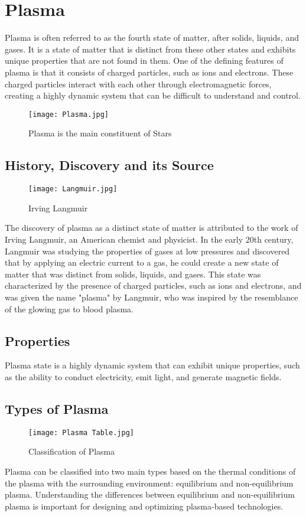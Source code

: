 \documentclass{article}
\begin{document}
\section{Plasma}
\large
Plasma is often referred to as the fourth state of matter, after solids, liquids, and gases. It is a state of matter that is distinct from these other states and exhibits unique properties that are not found in them. One of the defining features of plasma is that it consists of charged particles, such as ions and electrons. These charged particles interact with each other through electromagnetic forces, creating a highly dynamic system that can be difficult to understand and control.
\begin{figure}
\centering
\texttt{[image: Plasma.jpg]}
\caption{\label{fig:Plasma } Plasma is the main constituent of Stars}
\end{figure}

\subsection{History, Discovery and its Source}
\begin{wrapfigure}{l}{0.35\textwidth}
    \centering
    \texttt{[image: Langmuir.jpg]}
    \caption{\label{fig:Langmuir} Irving Langmuir} 
\end{wrapfigure}

The discovery of plasma as a distinct state of matter is attributed to the work of Irving Langmuir, an American chemist and physicist. In the early 20th century, Langmuir was studying the properties of gases at low pressures and discovered that by applying an electric current to a gas, he could create a new state of matter that was distinct from solids, liquids, and gases. This state was characterized by the presence of charged particles, such as ions and electrons, and was given the name "plasma" by Langmuir, who was inspired by the resemblance of the glowing gas to blood plasma.

\subsection{Properties}
\large
Plasma state is a highly dynamic system that can exhibit unique properties, such as the ability to conduct electricity, emit light, and generate magnetic fields.
\subsection{Types of Plasma}
 \begin{figure}[h]
\centering
\texttt{[image: Plasma Table.jpg]}
\caption{\label{fig:Plasma Table } Classification of Plasma}
\end{figure}
Plasma can be classified into two main types based on the thermal conditions of the plasma with the surrounding environment: equilibrium and non-equilibrium plasma.
Understanding the differences between equilibrium and non-equilibrium plasma is important for designing and optimizing plasma-based technologies.
\end{document}

